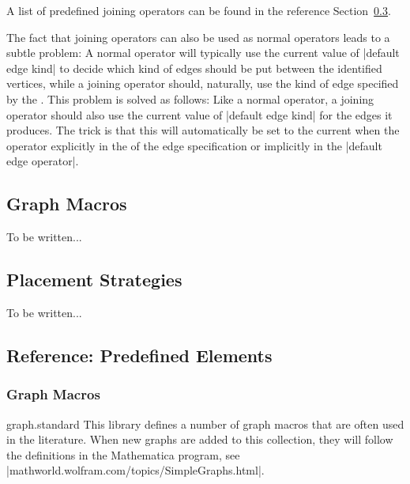 A list of predefined joining operators can be found in the reference
Section~\ref{section-library-graphs-reference}.

The fact that joining operators can also be used as normal operators
leads to a subtle problem: A normal operator will typically use the
current value of |default edge kind| to decide which kind of edges
should be put between the identified vertices, while a joining
operator should, naturally, use the kind of edge specified by the
. This problem is solved as follows: Like a
normal operator, a joining operator should also use the current value
of |default edge kind| for the edges it produces. The trick is that
this will automatically be set to the current  when the operator explicitly in the  of
the edge specification or implicitly in the |default edge operator|.


\subsection{Graph Macros}
\label{section-library-graphs-macros}

To be written...



\subsection{Placement Strategies}
\label{section-library-graphs-placement}

To be written...


\subsection{Reference: Predefined Elements}

\label{section-library-graphs-reference}


\subsubsection{Graph Macros}

\begin{tikzlibrary}{graph.standard}
  This library defines a number of graph macros that are often used in
  the literature. When new graphs are added to this collection, they
  will follow the definitions in the Mathematica program, see
  |mathworld.wolfram.com/topics/SimpleGraphs.html|. 
\end{tikzlibrary}

